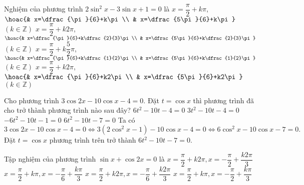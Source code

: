 \begin{ex}%
	Nghiệm của  phương trình $2\sin^2 x-3\sin x+1=0$ là
	\choice
	{$x=\dfrac{\pi }{2}+k\pi$, $\hoac{& x=\dfrac{\pi }{6}+k\pi \\ & x=\dfrac{5\pi }{6}+k\pi}$ $\left(k\in \mathbb{Z}\right)$}
	{$x=\dfrac{\pi }{2}+k2\pi$, $\hoac{& x=\dfrac{\pi }{6}+k\dfrac{2}{3}\pi \\ & x=\dfrac{5\pi }{6}+k\dfrac{2}{3}\pi}$ $\left(k\in \mathbb{Z}\right)$}
	{$x=\dfrac{\pi }{2}+k\dfrac{5}{2}\pi $, $\hoac{& x=\dfrac{\pi }{6}+k\dfrac{1}{2}\pi\\ & x=\dfrac{5\pi }{6}+k\dfrac{1}{2}\pi}$ $\left(k\in \mathbb{Z}\right)$}
	{\True $x=\dfrac{\pi }{2}+k2\pi$, $\hoac{& x=\dfrac{\pi }{6}+k2\pi \\ & x=\dfrac{5\pi }{6}+k2\pi}$ $\left(k\in \mathbb{Z}\right)$}
\end{ex}
\begin{ex}%
	Cho phương trình $3\cos 2x-10\cos x-4=0$. Đặt $t=\cos x$ thì phương trình đã cho trở thành phương trình nào sau đây?
	\choice
	{$6t^2-10t-4=0$}
	{$3t^2-10t-4=0$}
	{$-6t^2-10t-1=0$}
	{\True $6t^2-10t-7=0$}
	\loigiai
	{
		Ta có
		\[3\cos 2x-10\cos x-4=0 \Leftrightarrow 3\left(2\cos^2 x-1\right)-10\cos x-4=0 \Leftrightarrow 6\cos^2 x-10\cos x-7=0.\]
		Đặt $t=\cos x$ phương trình trên trở thành $6t^2-10t-7=0$.
	}
\end{ex}
\begin{ex}%
	Tập nghiệm của phương trình $\sin x+\cos 2x=0$ là
	\choice
	{$x=\dfrac{\pi}{2}+k2\pi, x=-\dfrac{\pi}{2}+\dfrac{k2\pi}{3}$}
	{$x=\dfrac{\pi}{2}+k\pi, x=-\dfrac{\pi}{6}+\dfrac{k\pi}{3}$}
	{\True $x=\dfrac{\pi}{2}+k2\pi, x=-\dfrac{\pi}{6}+\dfrac{k2\pi}{3}$}
	{$x=\dfrac{\pi}{2}+k\pi, x=-\dfrac{\pi}{2}+\dfrac{k\pi}{3}$}
\end{ex}





